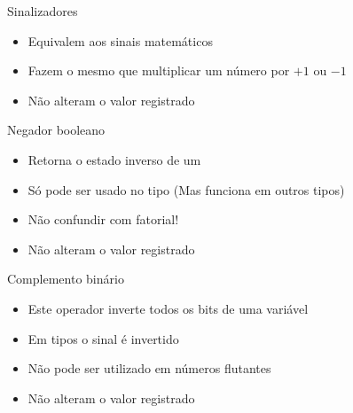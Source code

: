 \documentclass[11pt]{beamer}
\begin{document}
	\begin{frame}{Sinalizadores}
		\only<1>
		{
		\begin{itemize}
			\presentationPause\item Equivalem aos sinais matemáticos
			\presentationPause\item Fazem o mesmo que multiplicar um número por $+1$ ou $-1$
			\presentationPause\item Não alteram o valor registrado
		\end{itemize}
		\presentationPause
		}
		{
			
		}
	\end{frame}

	\begin{frame}{Negador booleano}
		\only<1>
		{
			\begin{itemize}
				\presentationPause\item Retorna o estado inverso de um 
				\presentationPause\item Só pode ser usado no tipo  \presentationPause(Mas funciona em outros tipos)
				\presentationPause\item Não confundir com fatorial!
				\presentationPause\item Não alteram o valor registrado
			\end{itemize}
			\presentationPause
		}
		{
			\presentationPause
		}
	\end{frame}

	\begin{frame}{Complemento binário}
		\only<1>
		{
			\begin{itemize}
				\presentationPause\item Este operador inverte todos os bits de uma variável
				\presentationPause\item Em tipos  o sinal é invertido
				\presentationPause\item Não pode ser utilizado em números flutantes
				\presentationPause\item Não alteram o valor registrado
			\end{itemize}
			\presentationPause
		}
		{
			\presentationPause
		}
	\end{frame}
\end{document}

